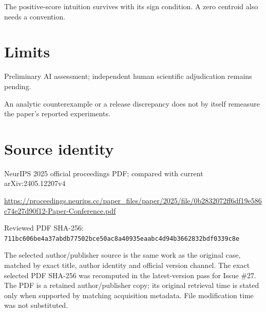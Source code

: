 \documentclass[11pt]{article}
\begin{document}
The positive-score intuition survives with its sign condition. A zero centroid also needs a convention.

\section*{Limits}

Preliminary AI assessment; independent human scientific adjudication remains pending.\par

An analytic counterexample or a release discrepancy does not by itself remeasure the paper’s reported experiments.\par

\section*{Source identity}

NeurIPS 2025 official proceedings PDF; compared with current arXiv:2405.12207v4

\url{https://proceedings.neurips.cc/paper_files/paper/2025/file/0b2832072ff6df19e586c74e27d90f12-Paper-Conference.pdf}

Reviewed PDF SHA-256: \nolinkurl{711bc606be4a37abdb77502bce50ac8a40935eaabc4d94b3662832bdf0339c8e}

The selected author/publisher source is the same work as the original case, matched by exact title, author identity and official version channel. The exact selected PDF SHA-256 was recomputed in the latest-version pass for Issue \#27. The PDF is a retained author/publisher copy; its original retrieval time is stated only when supported by matching acquisition metadata. File modification time was not substituted.
\end{document}
